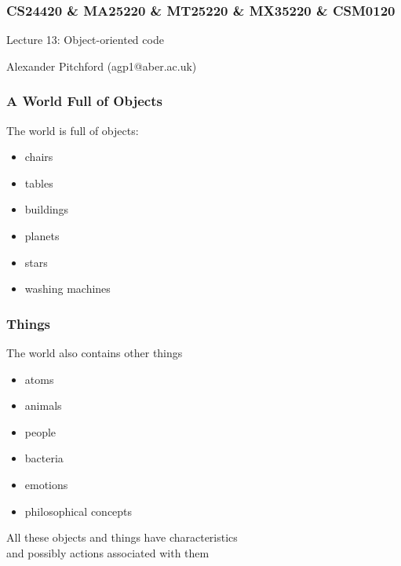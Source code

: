 \documentclass{beamer}
\begin{document}

\begin{frame}
\frametitle{CS24420 \& MA25220 \& MT25220 \& MX35220 \& CSM0120}

\begin{center}
\begin{huge}
Lecture 13: Object-oriented code 
\end{huge}
\bigskip

Alexander Pitchford (agp1@aber.ac.uk)

\end{center}
\end{frame}

\begin{frame}[fragile]
\frametitle{A World Full of Objects}
The world is full of objects:
\begin{itemize}
\item chairs
\item tables
\item buildings
\item planets
\item stars
\item washing machines
\end{itemize}

\end{frame}

\begin{frame}[fragile]
\frametitle{Things}
The world also contains other things
\begin{itemize}
\item atoms
\item animals
\item people
\item bacteria
\item emotions
\item philosophical concepts
\end{itemize}

\bigskip
All these objects and things have characteristics\\
\smallskip
and possibly actions associated with them
\bigskip

\end{frame}
\end{document}
